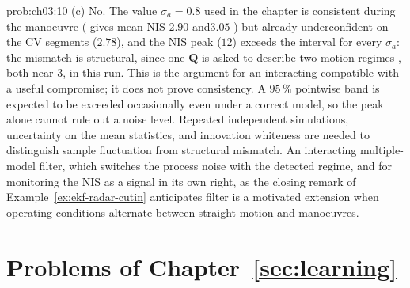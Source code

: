\documentclass[graybox,envcountchap]{style/SNmono}
\providecommand{\DIFadd}[1]{{\protect\color{blue} #1}} %
\providecommand{\DIFdel}[1]{{\protect\color{red} #1}} %
\providecommand{\DIFaddbegin}{} %
\providecommand{\DIFaddend}{} %
\providecommand{\DIFdelbegin}{} %
\providecommand{\DIFdelend}{} %
\begin{document}
\begin{sol}{prob:ch03:10}
(c) \DIFdelbegin \DIFdel{No. The value }\DIFdelend $\sigma_a=0.8$ \DIFdelbegin \DIFdel{used in the chapter is consistent during the manoeuvre (}\DIFdelend \DIFaddbegin \DIFadd{gives mean NIS $2.90$ and}\allowbreak \DIFaddend $3.05$\DIFdelbegin \DIFdel{) but already underconfident on the CV segments ($2.78$), and the NIS peak ($12$) exceeds the interval for every $\sigma_a$: the mismatch is structural, since one $\mathbf{Q}$ is asked to describe two motion regimes}\DIFdelend \DIFaddbegin \DIFadd{, both near $3$, in this run}\DIFaddend . This is \DIFdelbegin \DIFdel{the argument for an interacting }\DIFdelend \DIFaddbegin \DIFadd{compatible with a useful compromise; it does not prove consistency. A $95\,\%$ pointwise band is expected to be exceeded occasionally even under a correct model, so the peak alone cannot rule out a noise level. Repeated independent simulations, uncertainty on the mean statistics, and innovation whiteness are needed to distinguish sample fluctuation from structural mismatch. An interacting }\DIFaddend multiple-model \DIFdelbegin \DIFdel{filter, which switches the process noise with the detected regime, and for monitoring the NIS as a signal in its own right, as the closing remark of Example~\ref{ex:ekf-radar-cutin} anticipates}\DIFdelend \DIFaddbegin \DIFadd{filter is a motivated extension when operating conditions alternate between straight motion and manoeuvres}\DIFaddend .
\end{sol}



\section*{Problems of Chapter~\ref{sec:learning}}
\end{document}

